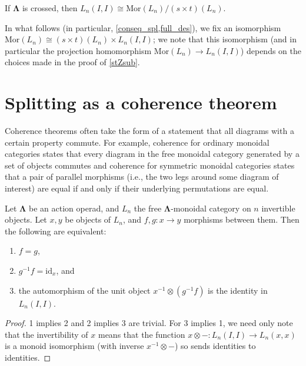 \documentclass{amsbook} %
\newcommand{\id}{\textrm{id}}
\newcommand{\ML}{\mathbf{\Lambda}}
\newcommand{\MorLn}{\mathrm{Mor}(L_n)}
\numberwithin{section}{chapter}
\begin{document}
\begin{cor}\label{lnII_mormodst}
If $\ML$ is crossed, then $L_n(I,I) \cong \MorLn / (s \times t)(L_n)$.
\end{cor}

\begin{conv}
In what follows (in particular, \cref{conseq_spl,full_des}), we fix an isomorphism $\MorLn \cong (s \times t)(L_n) \times L_n(I,I)$; we note that this isomorphism (and in particular the projection homomorphism $\MorLn \to L_n(I,I)$) depends on the choices made in the proof of \cref{stZsub}.

\end{conv}

\section{Splitting as a coherence theorem}\label{splitting_as_coh}

Coherence theorems often take the form of a statement that all diagrams with a certain property commute. For example, coherence for ordinary monoidal categories states that every diagram in the free monoidal category generated by a set of objects commutes and coherence for symmetric monoidal categories states that a pair of parallel morphisms (i.e., the two legs around some diagram of interest) are equal if and only if their underlying permutations are equal.

\begin{thm}\label{split_coh}
Let $\ML$ be an action operad, and $L_n$ the free $\ML$-monoidal category on $n$ invertible objects. Let $x, y$ be objects of $L_n$, and $f, g \colon  x \to y$ morphisms between them. Then the following are equivalent:
\begin{enumerate}
\item $f = g$,
\item $g^{-1} f = \id_x$, and
\item the automorphism of the unit object $x^{-1} \otimes (g^{-1} f)$ is the identity in $L_n(I,I)$.
\end{enumerate}
\end{thm}
\begin{proof}
1 implies 2 and 2 implies 3 are trivial. For 3 implies 1, we need only note that the invertibility of $x$ means that the function $x \otimes - \colon L_n(I,I) \to L_n(x,x)$ is a monoid isomorphism (with inverse $x^{-1} \otimes -$) so sends identities to identities.
\end{proof}
\end{document}
